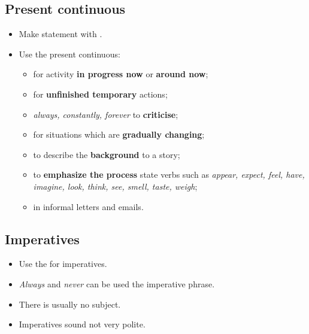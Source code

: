 \subsection{Present continuous}
\begin{itemize}
    \item Make statement with .
    \item Use the present continuous:
    \begin{itemize}
        \item for activity \textbf{in progress now} or \textbf{around now};
        \item for \textbf{unfinished temporary} actions;
        \item[\daash]  \textit{always, constantly, forever} to \textbf{criticise};
        \item[\daash] for situations which are \textbf{gradually changing};
        \item[\daash] to describe the \textbf{background} to a story;
        \item[\daash] to \textbf{emphasize the process}  state verbs such as
        \textit{appear, expect, feel, have, imagine, look, think, see, smell, taste, weigh};
        \item[\aast] in informal letters and emails.
    \end{itemize}
\end{itemize}

\subsection{Imperatives}
\begin{itemize}
    \item Use the  for imperatives.
    \item \textit{Always} and \textit{never} can be used  the imperative phrase.
    \item There is usually no subject.
    \item Imperatives sound not very polite.
\end{itemize}

